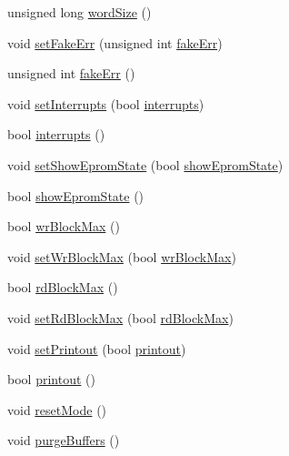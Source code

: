 \begin{DoxyCompactItemize}
\item 
unsigned long \hyperlink{classUsbFTMLInterface_ac313f412cbda6222ef817cb46083e2b3}{word\+Size} ()
\item 
void \hyperlink{classUsbFTMLInterface_a01a8080338c5de181ad70b7506c97bc4}{set\+Fake\+Err} (unsigned int \hyperlink{classUsbFTMLInterface_a0379dd75800521cea37580d68205f620}{fake\+Err})
\item 
unsigned int \hyperlink{classUsbFTMLInterface_a0379dd75800521cea37580d68205f620}{fake\+Err} ()
\item 
void \hyperlink{classUsbFTMLInterface_ac82eb9d63d4279998765dcc8c539bba9}{set\+Interrupts} (bool \hyperlink{classUsbFTMLInterface_afab1c2175bd2bca261ffa2b8ee67df2d}{interrupts})
\item 
bool \hyperlink{classUsbFTMLInterface_afab1c2175bd2bca261ffa2b8ee67df2d}{interrupts} ()
\item 
void \hyperlink{classUsbFTMLInterface_a051a6eb8e7fe43c9c97d61f8aafeea8e}{set\+Show\+Eprom\+State} (bool \hyperlink{classUsbFTMLInterface_aa62fc0edc39360eeb473fe9e91df9044}{show\+Eprom\+State})
\item 
bool \hyperlink{classUsbFTMLInterface_aa62fc0edc39360eeb473fe9e91df9044}{show\+Eprom\+State} ()
\item 
bool \hyperlink{classUsbFTMLInterface_a296da37a9d4c2d78338800ebc283bb80}{wr\+Block\+Max} ()
\item 
void \hyperlink{classUsbFTMLInterface_ab9ff3b850ed592872bd82c579052114f}{set\+Wr\+Block\+Max} (bool \hyperlink{classUsbFTMLInterface_a296da37a9d4c2d78338800ebc283bb80}{wr\+Block\+Max})
\item 
bool \hyperlink{classUsbFTMLInterface_ac0a393da12305baa111deb699f7190cb}{rd\+Block\+Max} ()
\item 
void \hyperlink{classUsbFTMLInterface_abdd0b79fb1d8a17c6a97969a291b858b}{set\+Rd\+Block\+Max} (bool \hyperlink{classUsbFTMLInterface_ac0a393da12305baa111deb699f7190cb}{rd\+Block\+Max})
\item 
void \hyperlink{classUsbFTMLInterface_a807c9a67253303a7bc1b14558b9819ac}{set\+Printout} (bool \hyperlink{classUsbFTMLInterface_a1045e3851406cf07e31c498d0de230e1}{printout})
\item 
bool \hyperlink{classUsbFTMLInterface_a1045e3851406cf07e31c498d0de230e1}{printout} ()
\item 
void \hyperlink{classUsbFTMLInterface_a91063d4374b617177c6b7a4022385dd1}{reset\+Mode} ()
\item 
void \hyperlink{classUsbFTMLInterface_ad5c6964b2618149f33c258f896e9f113}{purge\+Buffers} ()

\end{DoxyCompactItemize}
